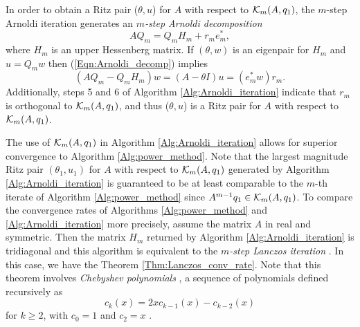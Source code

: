 In order to obtain a Ritz pair ($\theta, u$) for $A$ with respect to ${\mathcal K}_m(A, q_1)$, the $m$-step Arnoldi iteration generates an \textit{$m$-step Arnoldi decomposition}
\begin{equation} 		\label{Eqn:Arnoldi_decomp}
AQ_m = Q_m H_m + r_m e_m^*,
\end{equation}
where $H_m$ is an upper Hessenberg matrix.  If $(\theta, w)$ is an eigenpair for $H_m$ and $u = Q_mw$ then (\ref{Eqn:Arnoldi_decomp}) implies
\begin{equation} 			\label{Eqn:Arnoldi_decomp_Ritz_pairs}
(AQ_m - Q_mH_m)w = (A-\theta I) u = (e_m^*w)r_m.
\end{equation}
Additionally, steps 5 and 6 of Algorithm \ref{Alg:Arnoldi_iteration} indicate that $r_m$ is orthogonal to ${\mathcal K}_m(A, q_1)$, and thus ($\theta, u$) is a Ritz pair for $A$ with respect to ${\mathcal K}_m(A, q_1)$.  


The use of ${\mathcal K}_m(A, q_1)$ in Algorithm \ref{Alg:Arnoldi_iteration} allows for superior convergence to Algorithm \ref{Alg:power_method}.  Note that the largest magnitude Ritz pair $(\theta_1, u_1)$ for $A$ with respect to ${\mathcal K}_m(A, q_1)$ generated by Algorithm \ref{Alg:Arnoldi_iteration}  is guaranteed to be at least comparable to the $m$-th iterate of Algorithm \ref{Alg:power_method} since $A^{m-1}q_1 \in  {\mathcal K}_m(A, q_1)$.  To compare the convergence rates of Algorithms \ref{Alg:power_method} and \ref{Alg:Arnoldi_iteration} more precisely, assume the matrix $A$ in real and symmetric.  Then the matrix $H_m$ returned by Algorithm \ref{Alg:Arnoldi_iteration} is tridiagonal and this algorithm is equivalent to the \textit{$m$-step Lanczos iteration} \cite[Algorithm 10.1.1]{golub2012matrix}.  In this case, we have the Theorem \ref{Thm:Lanczos_conv_rate}.  Note that this theorem involves \textit{Chebyshev polynomials} \cite[Section 4.4]{saad2011numerical}, a sequence of polynomials defined recursively as
\begin{equation} 			\label{Def:Chebyshev_polys}
c_k(x) = 2x c_{k-1}(x) - c_{k-2}(x)
\end{equation}
for $k \geq 2$, with $c_0 = 1$ and $c_2 = x$ .

